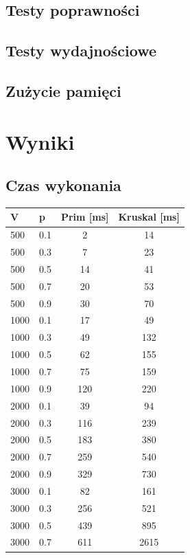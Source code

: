 \documentclass[a4paper, 10pt]{article}
\begin{document}
\subsection{Testy poprawności}
\subsection{Testy wydajnościowe}

\subsection{Zużycie pamięci}

\section{Wyniki}

\subsection{Czas wykonania}

\begin{center}
    \begin{tabular}{| l | l | c | c |}
    \hline
    V & p & Prim [ms] & Kruskal [ms] \\ \hline
	500 & 0.1 & 2 & 14  \\ 
	500 & 0.3 & 7& 23  \\ 
	500 & 0.5 & 14& 41  \\ 
	500 & 0.7 & 20& 53  \\ 
	500 & 0.9 & 30& 70  \\ \hline
	1000 & 0.1 & 17& 49  \\ 
	1000 & 0.3 & 49& 132  \\ 
	1000 & 0.5 & 62& 155 \\ 
	1000 & 0.7 & 75& 159 \\ 
	1000 & 0.9 & 120& 220  \\ \hline
	2000 & 0.1 & 39& 94  \\ 
	2000 & 0.3 & 116& 239  \\ 
	2000 & 0.5 & 183& 380  \\ 
	2000 & 0.7 & 259& 540  \\ 
	2000 & 0.9 & 329& 730  \\ \hline
	3000 & 0.1 & 82& 161\\ 
	3000 & 0.3 & 256& 521  \\ 
	3000 & 0.5 & 439& 895  \\ 
	3000 & 0.7 & 611& 2615  \\ \hline
    \end{tabular}
\end{center}
\end{document}
